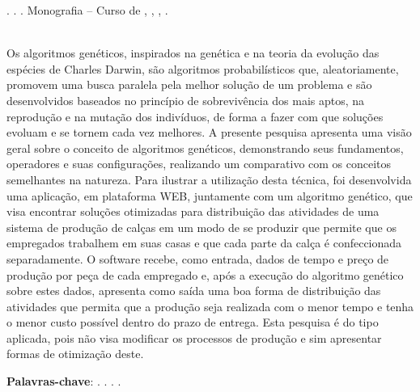 
\begin{OnehalfSpacing} 

\noindent \imprimirAutorCitacaoMaiuscula. {\bfseries\imprimirtitulo}. {\imprimirdata}.  Monografia -- Curso de {\MakeUppercase\imprimircurso}, {\imprimirinstituicao}, {\imprimirlocal}, {\imprimirdata}.

\vspace{\onelineskip}
\vspace{\onelineskip}
\vspace{\onelineskip}
\vspace{\onelineskip}

\begin{resumo}
~\\
\noindent Os algoritmos genéticos, inspirados na genética e na teoria da evolução das espécies de Charles Darwin,
são algoritmos probabilísticos que, aleatoriamente, promovem uma busca paralela pela melhor solução de um problema e são 
desenvolvidos baseados no princípio de sobrevivência dos mais aptos, na reprodução e na mutação dos indivíduos, de forma a fazer com 
que soluções evoluam e se tornem cada vez melhores. A presente pesquisa apresenta uma visão geral sobre
o conceito de algoritmos genéticos, demonstrando seus fundamentos, operadores e suas configurações, realizando um comparativo 
com os conceitos semelhantes na natureza. Para ilustrar a utilização desta técnica, foi desenvolvida uma aplicação, 
em plataforma WEB, juntamente com um algoritmo genético, que visa encontrar soluções otimizadas para distribuição 
das atividades de uma sistema de produção de calças em um modo de se produzir que permite que os empregados trabalhem em suas 
casas e que cada parte da calça é confeccionada separadamente. O software recebe, como entrada, dados de tempo e preço
de produção por peça de cada empregado e, após a execução do algoritmo genético sobre estes dados, apresenta como saída uma 
boa forma de distribuição das atividades que permita que a produção seja realizada com o menor tempo e tenha o menor custo possível 
dentro do prazo de entrega. Esta pesquisa é do tipo aplicada, pois não visa modificar os processos de produção e sim apresentar 
formas de otimização deste.

\vspace{\onelineskip}
\vspace*{\fill}
\noindent \textbf{Palavras-chave}: \imprimirPalavraChaveUm. \imprimirPalavraChaveDois. \imprimirPalavraChaveTres. \imprimirPalavraChaveQuatro.
\vspace{\onelineskip}
\end{resumo}

\end{OnehalfSpacing}
